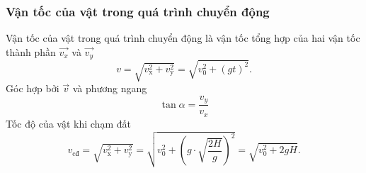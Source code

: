 \subsubsection{Vận tốc của vật trong quá trình chuyển động}
Vận tốc của vật trong quá trình chuyển động là vận tốc tổng hợp của hai vận tốc thành phần $\overrightarrow{v_x}$  và $\overrightarrow{v_y}$
\begin{equation*}
	v=\sqrt{v^2_{\text{x}} + v^2_{\text{y}} } = \sqrt{v^2_0+ (gt)^2}.
\end{equation*}
Góc hợp bởi $\vec{v}$ và phương ngang
$$\tan\alpha=\dfrac{v_y}{v_x}$$
Tốc độ của vật khi chạm đất
\begin{equation*}
	v_\text{cđ}=\sqrt{v^2_{\text{x}} + v^2_{\text{y}} } = \sqrt{v^2_0+ \left(g\cdot\sqrt{\dfrac{2H}{g}}\right)^2}=\sqrt{v^2_0+2gH}.
\end{equation*}
